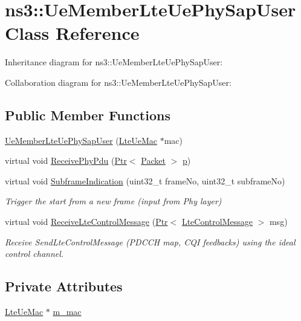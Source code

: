 \hypertarget{classns3_1_1UeMemberLteUePhySapUser}{}\section{ns3\+:\+:Ue\+Member\+Lte\+Ue\+Phy\+Sap\+User Class Reference}
\label{classns3_1_1UeMemberLteUePhySapUser}


Inheritance diagram for ns3\+:\+:Ue\+Member\+Lte\+Ue\+Phy\+Sap\+User\+:


Collaboration diagram for ns3\+:\+:Ue\+Member\+Lte\+Ue\+Phy\+Sap\+User\+:
\subsection*{Public Member Functions}
\begin{DoxyCompactItemize}
\item 
\hyperlink{classns3_1_1UeMemberLteUePhySapUser_aa9bc333d8f5614b6e434d183205a97b5}{Ue\+Member\+Lte\+Ue\+Phy\+Sap\+User} (\hyperlink{classns3_1_1LteUeMac}{Lte\+Ue\+Mac} $\ast$mac)
\item 
virtual void \hyperlink{classns3_1_1UeMemberLteUePhySapUser_a9e2506670cd083411e1cbd1c07d28089}{Receive\+Phy\+Pdu} (\hyperlink{classns3_1_1Ptr}{Ptr}$<$ \hyperlink{classns3_1_1Packet}{Packet} $>$ \hyperlink{lte__link__budget__x2__handover__measures_8m_ac9de518908a968428863f829398a4e62}{p})
\item 
virtual void \hyperlink{classns3_1_1UeMemberLteUePhySapUser_a56aa45c70f78a51cf33d825414d37fa5}{Subframe\+Indication} (uint32\+\_\+t frame\+No, uint32\+\_\+t subframe\+No)
\begin{DoxyCompactList}\small\item\em Trigger the start from a new frame (input from Phy layer) \end{DoxyCompactList}\item 
virtual void \hyperlink{classns3_1_1UeMemberLteUePhySapUser_aa0a4d717d141372c63e7d4006ad41323}{Receive\+Lte\+Control\+Message} (\hyperlink{classns3_1_1Ptr}{Ptr}$<$ \hyperlink{classns3_1_1LteControlMessage}{Lte\+Control\+Message} $>$ msg)
\begin{DoxyCompactList}\small\item\em Receive Send\+Lte\+Control\+Message (P\+D\+C\+CH map, C\+QI feedbacks) using the ideal control channel. \end{DoxyCompactList}\end{DoxyCompactItemize}
\subsection*{Private Attributes}
\begin{DoxyCompactItemize}
\item 
\hyperlink{classns3_1_1LteUeMac}{Lte\+Ue\+Mac} $\ast$ \hyperlink{classns3_1_1UeMemberLteUePhySapUser_ab6d2ec8968246e2632c6f35c6fe72b20}{m\+\_\+mac}
\end{DoxyCompactItemize}


